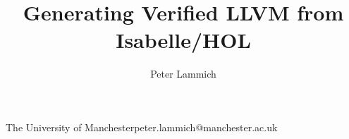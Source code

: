\documentclass[a4paper,USenglish,cleveref, autoref]{lipics-v2019}
\begin{document}
\title{Generating Verified LLVM from Isabelle/HOL}

\author{Peter Lammich}{The University of Manchester}{peter.lammich@manchester.ac.uk}{}{}


\maketitle

\setcounter{footnote}{0}

\end{document}
